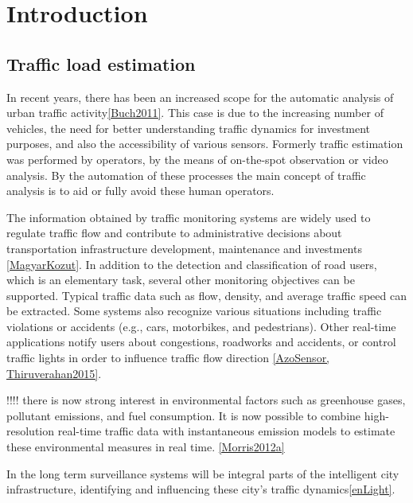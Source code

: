 \chapter*{Introduction}
\section{Traffic load estimation}
In recent years, there has been an increased scope for the automatic analysis of urban traffic activity\ref{Buch2011}.
This case is due to the increasing number of vehicles, the need for better understanding traffic dynamics for investment purposes, and also the accessibility of various sensors.
Formerly traffic estimation was performed by operators, by the means of on-the-spot observation or video analysis.
By the automation of these processes the main concept of traffic analysis is to aid or fully avoid these human operators.

The information obtained by traffic monitoring systems are widely used to regulate traffic flow and contribute to administrative decisions about transportation infrastructure development, maintenance and investments \ref{MagyarKozut}.
In addition to the detection and classification of road users, which is an elementary task, several other monitoring objectives can be supported. 
Typical traffic data such as flow, density, and average traffic speed can be extracted.
Some systems also recognize various situations including traffic violations or accidents (e.g., cars, motorbikes, and pedestrians).
Other real-time applications notify users about congestions, roadworks and accidents, or control traffic lights in order to influence traffic flow direction \ref{AzoSensor, Thiruverahan2015}.

!!!! there is now strong interest in environmental factors such as greenhouse gases, pollutant emissions, and fuel consumption. It is now possible to combine high-resolution real-time traffic data with instantaneous emission models to estimate these environmental measures in real time. \ref{Morris2012a}

In the long term surveillance systems will be integral parts of the intelligent city infrastructure, identifying and influencing these city's traffic dynamics\ref{enLight}.

